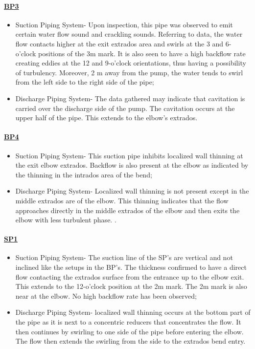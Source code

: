\paragraph{\underline{BP3}}
\begin{itemize}
	\item Suction Piping System- Upon inspection, this pipe was observed to emit certain water flow sound and crackling sounds. Referring to data, the water flow contacts higher at the exit extrados area and swirls at the 3 and 6-o'clock positions of the 3m mark. It is also seen to have a high backflow rate creating eddies at the 12 and 9-o'clock orientations, thus having a possibility of turbulency. Moreover, 2 m away from the pump, the water tends to swirl from the left side to the right side of the pipe; 
	\item Discharge Piping System- The data gathered may indicate that cavitation is carried over the discharge side of the pump. The cavitation occurs at the upper half of the pipe. This extends to the elbow's extrados.
	
\end{itemize}

\paragraph{\underline{BP4}}
\begin{itemize}
	\item Suction Piping System- This suction pipe inhibits localized wall thinning at the exit elbow extrados. Backflow is also present at the elbow as indicated by the thinning in the intrados area of the bend;
	
	\item Discharge Piping System- Localized wall thinning is not present except in the middle extrados are of the elbow. This thinning indicates that the flow approaches directly in the middle extrados of the elbow and then exits the elbow with less turbulent phase.
	.
\end{itemize}


\paragraph{\underline{SP1}}
\begin{itemize}
\item Suction Piping System- The suction line of the SP's are vertical and not inclined like the setups in the BP's. The thickness confirmed to have a direct flow contacting the extrados surface from the entrance up to the elbow exit. This extends to the 12-o'clock position at the 2m mark. The 2m mark is also near at the elbow. No high backflow rate has been observed;

\item Discharge Piping System- localized wall thinning occurs at the bottom part of the pipe as it is next to a concentric reducers that concentrates the flow. It then continues by swirling to one side of the pipe before entering the elbow. The flow then extends the swirling from the side to the extrados bend entry.
	
\end{itemize}

